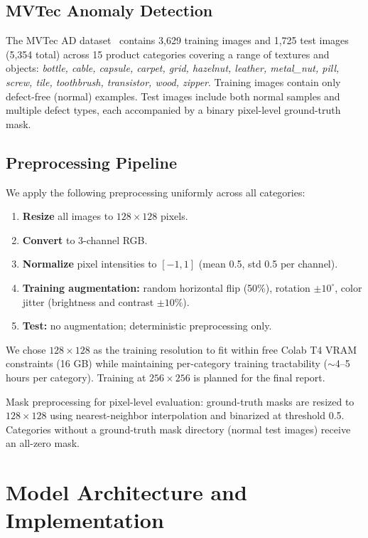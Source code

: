 \documentclass[11pt,letterpaper]{article}
\begin{document}
\subsection{MVTec Anomaly Detection}
The MVTec AD dataset~\cite{mvtec2019} contains 3,629 training images and
1,725 test images (5,354 total) across 15 product categories covering a range of textures and objects:
\textit{bottle, cable, capsule, carpet, grid, hazelnut, leather, metal\_nut, pill, screw,
tile, toothbrush, transistor, wood, zipper}. Training images contain only defect-free
(normal) examples. Test images include both normal samples and multiple defect types,
each accompanied by a binary pixel-level ground-truth mask.

\subsection{Preprocessing Pipeline}
We apply the following preprocessing uniformly across all categories:

\begin{enumerate}[leftmargin=*,itemsep=2pt]
  \item \textbf{Resize} all images to $128 \times 128$ pixels.
  \item \textbf{Convert} to 3-channel RGB.
  \item \textbf{Normalize} pixel intensities to $[-1, 1]$ (mean 0.5, std 0.5 per channel).
  \item \textbf{Training augmentation:} random horizontal flip (50\%), rotation $\pm10^\circ$,
        color jitter (brightness and contrast $\pm10\%$).
  \item \textbf{Test:} no augmentation; deterministic preprocessing only.
\end{enumerate}

We chose $128 \times 128$ as the training resolution to fit within free Colab T4 VRAM
constraints (16 GB) while maintaining per-category training tractability ($\sim$4--5
hours per category). Training at $256 \times 256$ is planned for the final report.

Mask preprocessing for pixel-level evaluation: ground-truth masks are resized to
$128 \times 128$ using nearest-neighbor interpolation and binarized at threshold 0.5.
Categories without a ground-truth mask directory (normal test images) receive an
all-zero mask.

\section{Model Architecture and Implementation}
\end{document}
